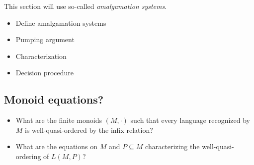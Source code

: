 This section will use so-called \emph{amalgamation systems}.

\begin{itemize}
    \item Define amalgamation systems
    \item Pumping argument
    \item Characterization
    \item Decision procedure
\end{itemize}

\subsection{Monoid equations?}

\begin{itemize}
    \item What are the finite monoids $(M, \cdot)$ such that
    every language recognized by $M$ is well-quasi-ordered by the infix relation?
    \item What are the equations on $M$ and $P \subseteq M$ characterizing 
    the well-quasi-ordering of $L(M, P)$?
\end{itemize}

